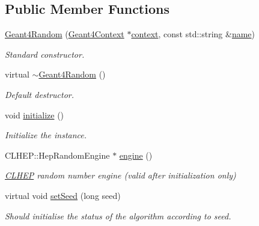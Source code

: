 \subsection*{Public Member Functions}
\begin{DoxyCompactItemize}
\item 
\hyperlink{class_d_d4hep_1_1_simulation_1_1_geant4_random_a44e88e26d5ae30b269b81c6d2dfc6511}{Geant4\+Random} (\hyperlink{class_d_d4hep_1_1_simulation_1_1_geant4_context}{Geant4\+Context} $\ast$\hyperlink{class_d_d4hep_1_1_simulation_1_1_geant4_action_aa9d87f0ec2a72b7fc2591b18f98d75cf}{context}, const std\+::string \&\hyperlink{class_d_d4hep_1_1_simulation_1_1_geant4_action_af374e70b014d16afb81dd9d77cc3894b}{name})
\begin{DoxyCompactList}\small\item\em Standard constructor. \end{DoxyCompactList}\item 
virtual \hyperlink{class_d_d4hep_1_1_simulation_1_1_geant4_random_a36518f1890fdb6177b2296b5f905fb07}{$\sim$\+Geant4\+Random} ()
\begin{DoxyCompactList}\small\item\em Default destructor. \end{DoxyCompactList}\item 
void \hyperlink{class_d_d4hep_1_1_simulation_1_1_geant4_random_a31f43f8b61c1eacccac4d89945e97f6b}{initialize} ()
\begin{DoxyCompactList}\small\item\em Initialize the instance. \end{DoxyCompactList}\item 
C\+L\+H\+E\+P\+::\+Hep\+Random\+Engine $\ast$ \hyperlink{class_d_d4hep_1_1_simulation_1_1_geant4_random_a80dcc27ca6d3ddc4a99f6f3b9d0d4465}{engine} ()
\begin{DoxyCompactList}\small\item\em \hyperlink{namespace_c_l_h_e_p}{C\+L\+H\+EP} random number engine (valid after initialization only) \end{DoxyCompactList}\item 
virtual void \hyperlink{class_d_d4hep_1_1_simulation_1_1_geant4_random_a67c43b5a941c94c3bbf7d134274bbde8}{set\+Seed} (long seed)
\begin{DoxyCompactList}\small\item\em Should initialise the status of the algorithm according to seed. \end{DoxyCompactList}\item 

\end{DoxyCompactItemize}
